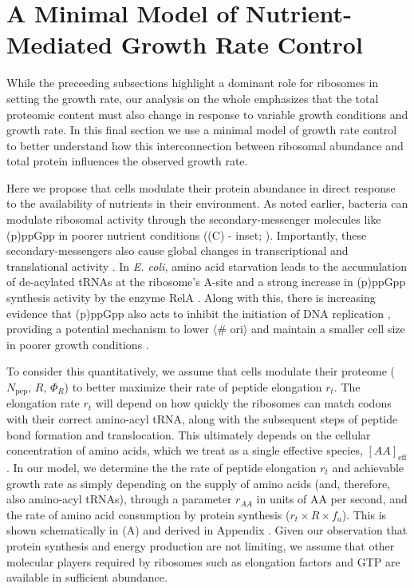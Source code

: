 \section{A Minimal Model of Nutrient-Mediated Growth Rate Control}
\label{sec:minimal_model}
While the preceeding subsections highlight a dominant role for ribosomes in
setting the growth rate, our analysis on the whole emphasizes that the total
proteomic content must also change in response to variable growth conditions and
growth rate. In this final section we use a minimal model of growth rate control
to better understand how this interconnection between ribosomal abundance and
total protein influences the observed growth rate.

Here we propose that cells modulate their protein abundance in direct response
to the availability of nutrients in their environment. As noted earlier,
bacteria can modulate ribosomal activity through the secondary-messenger
molecules like (p)ppGpp in poorer nutrient conditions ((C) -
inset; \cite{dai2016}). Importantly, these secondary-messengers also cause
global changes in transcriptional and translational activity
\citep{hauryliuk2015, zhu2019, Buke2020}. In \textit{E. coli}, amino acid
starvation leads to the accumulation of de-acylated tRNAs at the ribosome's
A-site and a strong increase in (p)ppGpp synthesis activity by the enzyme RelA
\citep{hauryliuk2015}. Along with this,  there is increasing evidence that
(p)ppGpp also acts to inhibit the initiation of DNA replication
\citep{kraemer2019}, providing a potential mechanism to lower $\langle$\#
ori$\rangle$ and maintain a smaller cell size in poorer growth conditions
\citep{fernandezcoll2020}.

To consider this quantitatively, we assume that cells modulate their proteome
($N_\text{pep}$, $R$, $\Phi_R$) to better maximize their rate of peptide
elongation $r_t$. The elongation rate $r_t$ will depend on how quickly the ribosomes can
match codons with their correct amino-acyl tRNA, along with the subsequent steps
of peptide bond formation and translocation. This ultimately depends on the
cellular concentration of amino acids, which we treat as a single effective
species, $[AA]_\text{eff}$. In our model, we determine the the rate of peptide
elongation $r_t$ and achievable growth rate as simply depending on the supply of
amino acids (and, therefore, also amino-acyl tRNAs), through a parameter
$r_{AA}$ in units of AA per second, and the rate of amino acid consumption by
protein synthesis ($r_t \times R \times f_a$). This is shown schematically in
(A) and derived in Appendix . Given our observation
that protein synthesis and energy production are not limiting, we
assume that other molecular players required by ribosomes such as elongation
factors and GTP are available in sufficient abundance.

